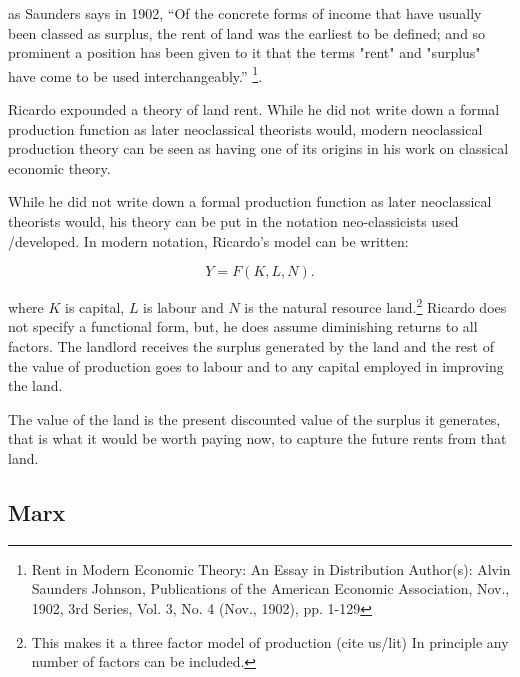 as Saunders says in 1902, ``Of the concrete forms of income that have usually been classed as surplus, the rent of land was the earliest to be defined; and so prominent a position has been given to it that the terms "rent" and "surplus" have come to be used interchangeably.'' \footnote{Rent in Modern Economic Theory: An Essay in Distribution Author(s): Alvin Saunders Johnson, Publications of the American Economic Association, Nov., 1902, 3rd Series, Vol. 3, No. 4 (Nov., 1902), pp. 1-129}. 

Ricardo expounded a theory of land rent. While he did not write down a formal production function as later neoclassical theorists would, modern neoclassical production theory can be seen as having one of its origins in his work on classical economic theory. %

While he did not write down a formal production function as later neoclassical theorists would, his theory can be put in the notation neo-classicists used /developed. In modern notation, Ricardo's model can be written: 

\begin{equation} 
Y=F(K,L,N).
\label{eqn-production-ricardo}
\end{equation} 

where $K$ is capital, $L$ is labour and $N$  is the natural resource land.\footnote{This makes it a three factor model of production (cite us/lit) In principle any number of factors can be included.}  
Ricardo does not specify a functional form, but, %
he does assume diminishing returns to all factors. The landlord  receives the surplus generated by the land and the rest of the value of production goes to labour and to any capital employed in improving the land. 

The value of the land is the present discounted value of the surplus it generates, that is what it would be worth paying now, to capture the future rents from that land.


\subsection{Marx}



